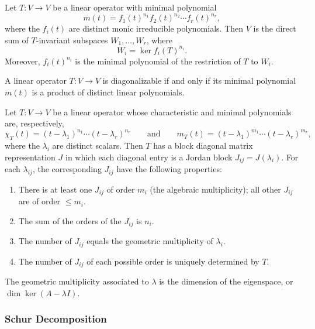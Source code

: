 \begin{theorem}
Let $T \colon V \rightarrow V$ be a linear operator with minimal polynomial
\[
m(t)=f_1(t)^{n_1}f_2(t)^{n_2}\cdots f_r(t)^{n_r},
\]
where the $f_i(t)$ are distinct monic irreducible polynomials. 
Then $V$ is the direct sum of $T$-invariant subspaces $W_1,\ldots,W_r$, where
\[
W_i=\ker f_i(T)^{n_i}.
\]
Moreover, $f_i(t)^{n_i}$ is the minimal polynomial of the 
restriction of $T$ to $W_i$.
\end{theorem}

\begin{theorem}
A linear operator $T \colon V \rightarrow V$ is diagonalizable 
if and only if its minimal polynomial $m(t)$ is a product of 
distinct linear polynomials.
\end{theorem}


\begin{theorem}
Let $T:V\to V$ be a linear operator whose characteristic and minimal
polynomials are, respectively,
\[
\chi_T(t)
=
(t-\lambda_1)^{n_1}\cdots(t-\lambda_r)^{n_r}
\qquad\text{and}\qquad
m_T(t)
=
(t-\lambda_1)^{m_1}\cdots(t-\lambda_r)^{m_r},
\]
where the $\lambda_i$ are distinct scalars. Then $T$ has a block diagonal
matrix representation $J$ in which each diagonal entry is a Jordan block
$J_{ij}=J(\lambda_i)$. For each $\lambda_{ij}$, the corresponding $J_{ij}$
have the following properties:
\begin{enumerate}
    \item There is at least one $J_{ij}$ of order $m_i$ (the algebraic multiplicity); all other
    $J_{ij}$ are of order $\leq m_i$.
    \item The sum of the orders of the $J_{ij}$ is $n_i$.
    \item The number of $J_{ij}$ equals the geometric multiplicity
    of $\lambda_i$.
    \item The number of $J_{ij}$ of each possible order is uniquely
    determined by $T$.
\end{enumerate}
\end{theorem}

\begin{remark}
The geometric multiplicity associated to $\lambda$ is the dimension of the eigenspace, or 
$\dim \ker(A - \lambda I)$.
\end{remark}


\subsubsection{Schur Decomposition}

